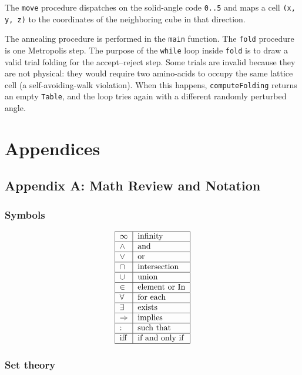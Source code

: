 \documentclass[justified, sixbynine]{tufte-book}
\def\ft{\small\tt}
\theoremstyle{plain}%
\newtheorem * {corollary}{Corollary}
\theoremstyle{definition}
\theoremstyle{remark}
\newtheorem * {remark}{Remark}
\newtheorem * {note}{Note}
\begin{document}
\begin{fullwidth}
The {\ft move} procedure dispatches on the solid-angle code {\ft 0..5} and maps a cell {\ft (x, y, z)} to the coordinates of the neighboring cube in that direction.

The annealing procedure is performed in the {\ft main} function. The {\ft fold} procedure is one Metropolis step. The purpose of the {\ft while} loop inside {\ft fold} is to draw a valid trial folding for the accept--reject step. Some trials are invalid because they are not physical: they would require two amino-acids to occupy the same lattice cell (a self-avoiding-walk violation). When this happens, {\ft computeFolding} returns an empty {\ft Table}, and the loop tries again with a different randomly perturbed angle.

\chapter{Appendices}

\goodbreak\section{Appendix A: Math Review and Notation}

\goodbreak\subsection{Symbols}

\begin{equation}
\begin{tabular}{|l|l|}
\hline
$\infty $ & infinity \\ \hline
$\wedge $ & and \\ \hline
$\vee $ & or \\ \hline
$\cap $ & intersection \\ \hline
$\cup $ & union \\ \hline
$\in $ & element or In \\ \hline
$\forall $ & for each \\ \hline
$\exists $ & exists \\ \hline
$\Rightarrow $ & implies \\ \hline
: & such that \\ \hline
iff & if and only if \\ \hline
\end{tabular}
\end{equation}

\goodbreak\subsection{Set theory}


\end{fullwidth}
\end{document}

